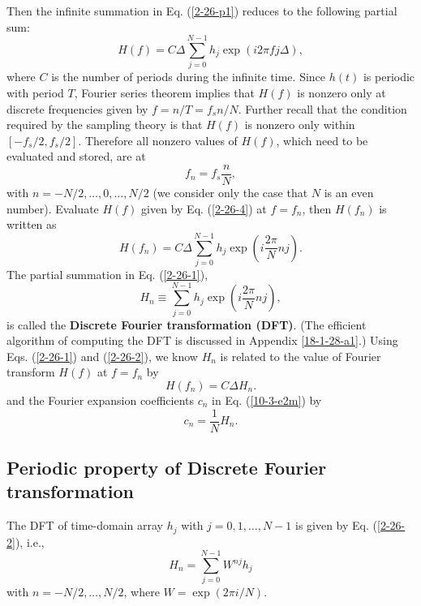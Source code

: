\documentclass{article}
\newcommand{\tmstrong}[1]{\textbf{#1}}
\begin{document}
Then the infinite summation in Eq. (\ref{2-26-p1}) reduces to the following
partial sum:
\begin{equation}
  \label{2-26-4} H (f) = C \Delta \sum_{j = 0}^{N - 1} h_j \exp (i 2 \pi f j
  \Delta),
\end{equation}
where $C$ is the number of periods during the infinite time. Since $h (t)$ is
periodic with period $T$, Fourier series theorem implies that $H (f)$ is
nonzero only at discrete frequencies given by $f = n / T = f_s n / N$. Further
recall that the condition required by the sampling theory is that $H (f)$ is
nonzero only within $[- f_s / 2, f_s / 2]$. Therefore all nonzero values of $H
(f)$, which need to be evaluated and stored, are at
\begin{equation}
  \label{10-26-1} f_n = f_s \frac{n}{N},
\end{equation}
with $n = - N / 2, \ldots, 0, \ldots, N / 2$ (we consider only the case that
$N$ is an even number). Evaluate $H (f)$ given by Eq. (\ref{2-26-4}) at $f =
f_n$, then $H (f_n)$ is written as
\begin{equation}
  \label{2-26-1} H (f_n) = C \Delta \sum_{j = 0}^{N - 1} h_j \exp \left( i
  \frac{2 \pi}{N} n j \right) .
\end{equation}
The partial summation in Eq. (\ref{2-26-1}),
\begin{equation}
  \label{2-26-2} H_n \equiv \sum_{j = 0}^{N - 1} h_j \exp \left( i \frac{2
  \pi}{N} n j \right),
\end{equation}
is called the {\tmstrong{Discrete Fourier transformation (DFT)}}. (The
efficient algorithm of computing the DFT is discussed in Appendix
\ref{18-1-28-a1}.) Using Eqs. (\ref{2-26-1}) and (\ref{2-26-2}), we know $H_n$
is related to the value of Fourier transform $H (f)$ at $f = f_n$ by
\begin{equation}
  H (f_n) = C \Delta H_n .
\end{equation}
and the Fourier expansion coefficients $c_n$ in Eq. (\ref{10-3-e2m}) by
\begin{equation}
  c_n = \frac{1}{N} H_n .
\end{equation}

\subsection{Periodic property of Discrete Fourier transformation}

The DFT of time-domain array $h_j$ with $j = 0, 1, \ldots, N - 1$ is given by
Eq. (\ref{2-26-2}), i.e.,
\begin{equation}
  \label{3-25-e3} H_n = \sum_{j = 0}^{N - 1} W^{n j} h_j
\end{equation}
with $n = - N / 2, \ldots, N / 2$, where $W = \exp (2 \pi i / N)$.
\end{document}
